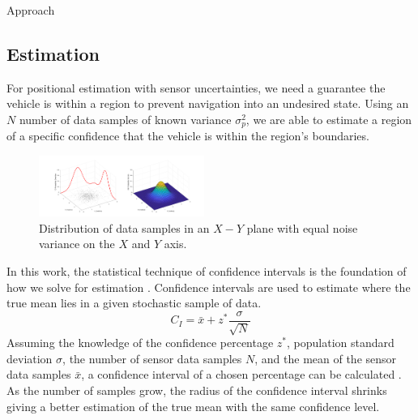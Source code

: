 \begin{section}{Approach}
\subsection{Estimation} 
For positional   estimation with sensor uncertainties, we need a guarantee the vehicle is within a region to prevent navigation into an undesired state. Using an $N$ number of data samples of known variance $\sigma_p^2$, we are able to estimate a region of a specific confidence that the vehicle is within the region's boundaries. 
\begin{figure}[ht!]
\vspace{1pt}
\centering
\includegraphics[width=0.48\textwidth]{GaussianPDF.png}
\caption{Distribution of data samples in an $X-Y$ plane with equal noise variance on the $X$ and $Y$ axis.}
\label{fig:gauss_pdf}
\end{figure}
In this work, the statistical technique of confidence intervals is the foundation of how we solve for estimation . Confidence intervals are used to estimate where the true mean lies in a given stochastic sample of data. 
    \begin{equation}
     \label{Confidence_interval}
		C_I = \bar{x} + z^{*}\frac{\sigma}{\sqrt{N}}
	\end{equation}
Assuming the knowledge of the confidence percentage $z^{*}$, population standard deviation $ \sigma $, the number of sensor data samples $N$, and the mean of the sensor data samples $ \bar{x} $, a confidence interval of a chosen percentage can be calculated . As the number of samples grow, the radius of the confidence interval shrinks giving a better estimation of the true mean with the same confidence level.


\end{section}

